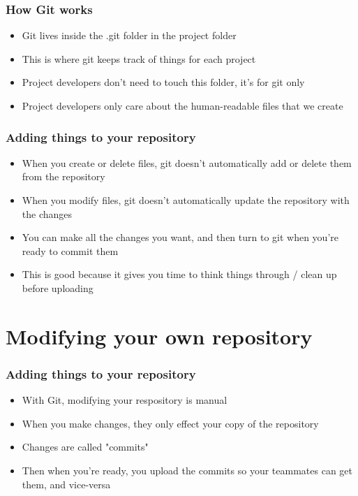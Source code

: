 \documentclass{beamer}
\begin{document}
\begin{frame}
\frametitle{How Git works}
\begin{itemize}
\item Git lives inside the .git folder in the project folder
\item This is where git keeps track of things for each project
\item Project developers don't need to touch this folder, it's for git only
\item Project developers only care about the human-readable files that we create
\end{itemize}
\end{frame}

\begin{frame}
\frametitle{Adding things to your repository}
\begin{itemize}
\item When you create or delete files, git doesn't automatically add or delete them from the repository
\item When you modify files, git doesn't automatically update the repository with the changes
\item You can make all the changes you want, and then turn to git when you're ready to commit them
\item This is good because it gives you time to think things through / clean up before uploading
\end{itemize}
\end{frame}

\section{Modifying your own repository}
\begin{frame}
\frametitle{Adding things to your repository}
\begin{itemize}
\item With Git, modifying your respository is manual
\item When you make changes, they only effect your copy of the repository
\item Changes are called "commits"
\item Then when you're ready, you upload the commits so your teammates can get them, and vice-versa
\end{itemize}
\end{frame}
\end{document}
